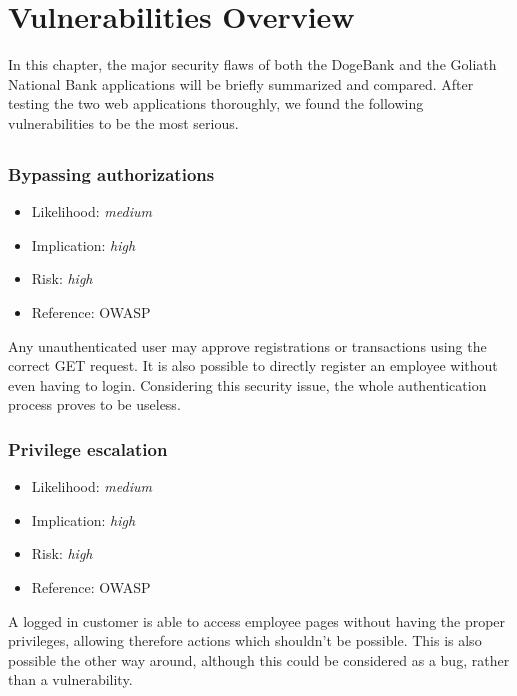 \chapter{Vulnerabilities Overview}\label{chapter:vulnerabilities_overview}
In this chapter, the major security flaws of both the DogeBank and the Goliath National Bank applications will be briefly summarized and compared.\newline
After testing the two web applications thoroughly, we found the following vulnerabilities to be the most serious.
\section{\doge}
\subsection{Bypassing authorizations} \label{over:bypassing}
\begin{itemize}
	\item Likelihood: \textit{medium}
	\item Implication: \textit{high}
	\item Risk: \textit{high}
	\item Reference: OWASP 
\end{itemize}
Any unauthenticated user may approve registrations or transactions using the correct GET request. It is also possible to directly register an employee without even having to login. Considering this security issue, the whole authentication process proves to be useless.

\subsection{Privilege escalation} \label{over:privilege}
\begin{itemize}
	\item Likelihood: \textit{medium}
	\item Implication: \textit{high}
	\item Risk: \textit{high}
	\item Reference: OWASP 
\end{itemize}
A logged in customer is able to access employee pages without having the proper privileges, allowing therefore actions which shouldn't be possible. This is also possible the other way around, although this could be considered as a bug, rather than a vulnerability.

